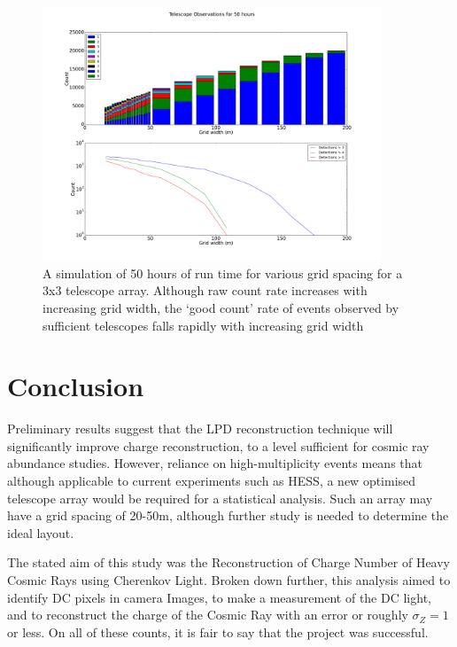 \documentclass[11pt]{article}
\begin{document}
\begin{figure}
\begin{center}
\includegraphics[width=0.9\textwidth]{optimiselayout}
\caption{A simulation of 50 hours of run time for various grid spacing for a 3x3 telescope array. Although raw count rate increases with increasing grid width, the \textquoteleft good count' rate of events observed by sufficient telescopes falls rapidly with increasing grid width}
\label{fig:optmiselayout}
\end{center}
\end{figure}

\section{Conclusion}
Preliminary results suggest that the LPD reconstruction technique will significantly improve charge reconstruction, to a level sufficient for cosmic ray abundance studies. However, reliance on high-multiplicity events means that although applicable to current experiments such as HESS, a new optimised telescope array would be required for a statistical analysis. Such an array may have a grid spacing of 20-50m, although further study is needed to determine the ideal layout.

The stated aim of this study was the Reconstruction of Charge Number of Heavy Cosmic Rays using Cherenkov Light. Broken down further, this analysis aimed to identify DC pixels in camera Images, to make a measurement of the DC light, and to reconstruct the charge of the Cosmic Ray with an error or roughly $\sigma_{Z}=1$ or less. On all of these counts, it is fair to say that the project was successful.
\end{document}
